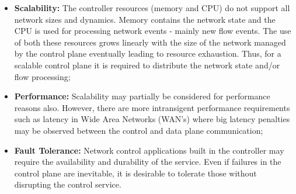 \begin{itemize}
\item[] \textbf{Scalability:}  The controller resources (memory and CPU) do not support all network sizes and dynamics.  Memory contains the network state and the CPU is used for processing network events - mainly new flow events. The use of both these resources grows linearly with the size of the network managed by the control plane eventually leading to  resource exhaustion. Thus, for a scalable control plane it is required to distribute the network state and/or flow processing; 
\item[] \textbf{Performance:}  Scalability may partially be considered for performance reasons also. However, there are more intransigent performance requirements such as latency in Wide Area Networks (WAN's) where big latency penalties may be observed between the  control and data plane  communication; 
\item[] \textbf{Fault Tolerance:} Network control applications built in the controller  may require the availability and durability of the service. Even if failures in the control plane are inevitable, it is desirable to tolerate those without disrupting the  control service. 
\end{itemize}

